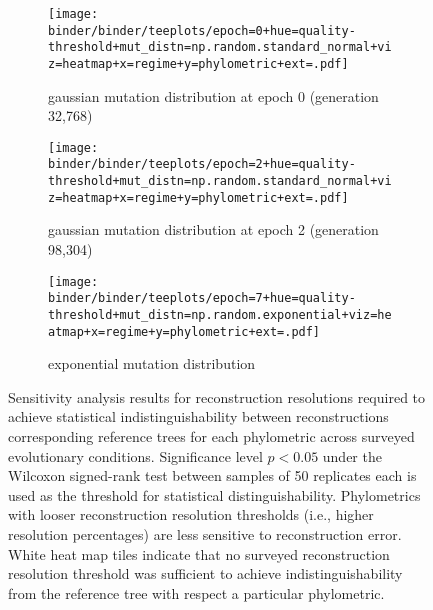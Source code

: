 \begin{figure*}
  \centering
  \begin{subfigure}[b]{\textwidth}
    \centering
    \texttt{[image: binder/binder/teeplots/epoch=0+hue=quality-threshold+mut\_distn=np.random.standard\_normal+viz=heatmap+x=regime+y=phylometric+ext=.pdf]}
    \caption{%
      gaussian mutation distribution at epoch 0 (generation 32,768)}
    \label{fig:reconstructed-tree-phylometrics-error-sensitivity-analysis:epoch0}
  \end{subfigure}
  \begin{subfigure}[b]{\textwidth}
    \centering
    \texttt{[image: binder/binder/teeplots/epoch=2+hue=quality-threshold+mut\_distn=np.random.standard\_normal+viz=heatmap+x=regime+y=phylometric+ext=.pdf]}
    \caption{%
      gaussian mutation distribution at epoch 2 (generation 98,304)}
    \label{fig:reconstructed-tree-phylometrics-error-sensitivity-analysis:epoch2}
  \end{subfigure}
  \begin{subfigure}[b]{\textwidth}
    \centering
    \texttt{[image: binder/binder/teeplots/epoch=7+hue=quality-threshold+mut\_distn=np.random.exponential+viz=heatmap+x=regime+y=phylometric+ext=.pdf]}
    \caption{%
      exponential mutation distribution}
    \label{fig:reconstructed-tree-phylometrics-error-sensitivity-analysis:exponential}
  \end{subfigure}
  \caption{%
    Sensitivity analysis results for reconstruction resolutions required to achieve statistical indistinguishability between reconstructions corresponding reference trees for each phylometric across surveyed evolutionary conditions.
    Significance level $p<0.05$ under the Wilcoxon signed-rank test between samples of 50 replicates each is used as the threshold for statistical distinguishability.
    Phylometrics with looser reconstruction resolution thresholds (i.e., higher resolution percentages) are less sensitive to reconstruction error.
    White heat map tiles indicate that no surveyed reconstruction resolution threshold was sufficient to achieve indistinguishability from the reference tree with respect a particular phylometric.
  }
  \label{fig:reconstructed-tree-phylometrics-error-sensitivity-analysis}
\end{figure*}

